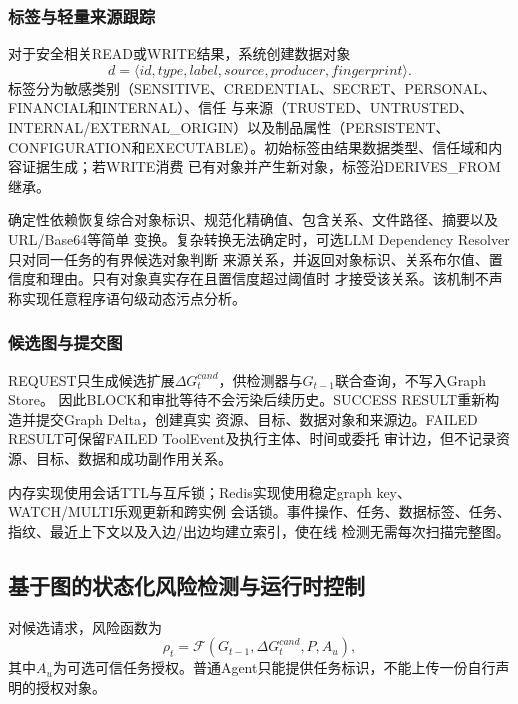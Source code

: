\subsubsection{标签与轻量来源跟踪}

对于安全相关READ或WRITE结果，系统创建数据对象
\begin{equation}
d=\langle id,type,label,source,producer,fingerprint\rangle.
\label{eq:data-object-atg}
\end{equation}
标签分为敏感类别（SENSITIVE、CREDENTIAL、SECRET、PERSONAL、FINANCIAL和INTERNAL）、信任
与来源（TRUSTED、UNTRUSTED、INTERNAL/EXTERNAL\_ORIGIN）以及制品属性（PERSISTENT、
CONFIGURATION和EXECUTABLE）。初始标签由结果数据类型、信任域和内容证据生成；若WRITE消费
已有对象并产生新对象，标签沿DERIVES\_FROM继承。

确定性依赖恢复综合对象标识、规范化精确值、包含关系、文件路径、摘要以及URL/Base64等简单
变换。复杂转换无法确定时，可选LLM Dependency Resolver只对同一任务的有界候选对象判断
来源关系，并返回对象标识、关系布尔值、置信度和理由。只有对象真实存在且置信度超过阈值时
才接受该关系。该机制不声称实现任意程序语句级动态污点分析。

\subsubsection{候选图与提交图}

REQUEST只生成候选扩展$\Delta G_t^{cand}$，供检测器与$G_{t-1}$联合查询，不写入Graph Store。
因此BLOCK和审批等待不会污染后续历史。SUCCESS RESULT重新构造并提交Graph Delta，创建真实
资源、目标、数据对象和来源边。FAILED RESULT可保留FAILED ToolEvent及执行主体、时间或委托
审计边，但不记录资源、目标、数据和成功副作用关系。

内存实现使用会话TTL与互斥锁；Redis实现使用稳定graph key、WATCH/MULTI乐观更新和跨实例
会话锁。事件操作、任务、数据标签、任务、指纹、最近上下文以及入边/出边均建立索引，使在线
检测无需每次扫描完整图。

\subsection{基于图的状态化风险检测与运行时控制}
\label{subsec:graph-detection}

对候选请求，风险函数为
\begin{equation}
\rho_t=\mathcal{F}(G_{t-1},\Delta G_t^{cand},P,A_u),
\label{eq:graph-risk}
\end{equation}
其中$A_u$为可选可信任务授权。普通Agent只能提供任务标识，不能上传一份自行声明的授权对象。

